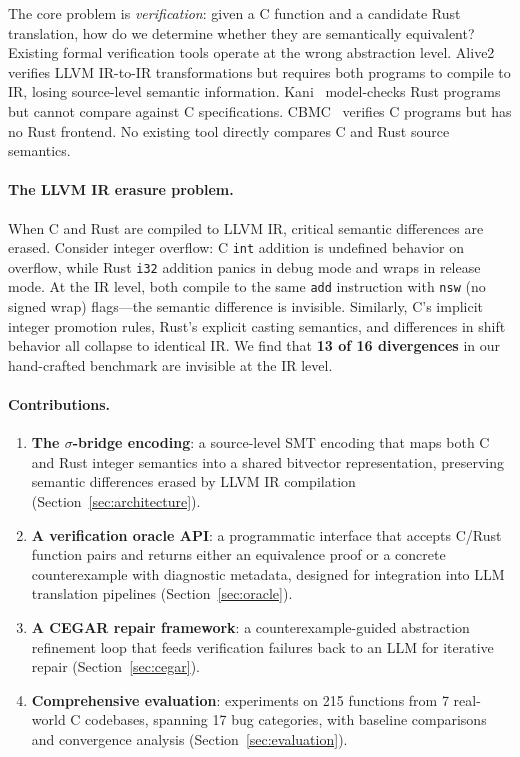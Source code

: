 \documentclass[10pt,letterpaper]{article}
\begin{document}
The core problem is \emph{verification}: given a C function and a candidate Rust
translation, how do we determine whether they are semantically equivalent? Existing
formal verification tools operate at the wrong abstraction level. Alive2~\cite{alive2}
verifies LLVM IR-to-IR transformations but requires both programs to compile to IR,
losing source-level semantic information. Kani~\cite{kani} model-checks Rust programs
but cannot compare against C specifications. CBMC~\cite{cbmc} verifies C programs but
has no Rust frontend. No existing tool directly compares C and Rust source semantics.

\paragraph{The LLVM IR erasure problem.}
When C and Rust are compiled to LLVM IR, critical semantic differences are erased.
Consider integer overflow: C \texttt{int} addition is undefined behavior on overflow,
while Rust \texttt{i32} addition panics in debug mode and wraps in release mode.
At the IR level, both compile to the same \texttt{add} instruction with \texttt{nsw}
(no signed wrap) flags---the semantic difference is invisible. Similarly, C's implicit
integer promotion rules, Rust's explicit casting semantics, and differences in shift
behavior all collapse to identical IR. We find that \textbf{13 of 16 divergences} in
our hand-crafted benchmark are invisible at the IR level.

\paragraph{Contributions.}
\begin{enumerate}[leftmargin=*,itemsep=2pt]
\item \textbf{The $\sigma$-bridge encoding}: a source-level SMT encoding that maps
  both C and Rust integer semantics into a shared bitvector representation, preserving
  semantic differences erased by LLVM IR compilation (Section~\ref{sec:architecture}).

\item \textbf{A verification oracle API}: a programmatic interface that accepts
  C/Rust function pairs and returns either an equivalence proof or a concrete
  counterexample with diagnostic metadata, designed for integration into LLM
  translation pipelines (Section~\ref{sec:oracle}).

\item \textbf{A CEGAR repair framework}: a counterexample-guided abstraction
  refinement loop that feeds verification failures back to an LLM for iterative
  repair (Section~\ref{sec:cegar}).

\item \textbf{Comprehensive evaluation}: experiments on 215 functions from 7
  real-world C codebases, spanning 17 bug categories, with baseline comparisons
  and convergence analysis (Section~\ref{sec:evaluation}).
\end{enumerate}
\end{document}
